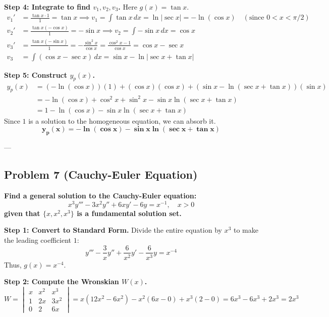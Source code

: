 \documentclass[12pt]{article}
\begin{document}
\textbf{Step 4: Integrate to find $v_1, v_2, v_3$.}
Here $g(x) = \tan x$.
\begin{align*}
v_1' &= \frac{\tan x \cdot 1}{1} = \tan x \implies v_1 = \int \tan x \, dx = \ln|\sec x| = -\ln(\cos x) \quad (\text{since } 0 < x < \pi/2) \\
v_2' &= \frac{\tan x (-\cos x)}{1} = -\sin x \implies v_2 = \int -\sin x \, dx = \cos x \\
v_3' &= \frac{\tan x (-\sin x)}{1} = -\frac{\sin^2 x}{\cos x} = \frac{\cos^2 x - 1}{\cos x} = \cos x - \sec x \\
v_3 &= \int (\cos x - \sec x) \, dx = \sin x - \ln|\sec x + \tan x|
\end{align*}

\textbf{Step 5: Construct $y_p(x)$.}
\begin{align*}
y_p(x) &= (-\ln(\cos x))(1) + (\cos x)(\cos x) + (\sin x - \ln(\sec x + \tan x))(\sin x) \\
&= -\ln(\cos x) + \cos^2 x + \sin^2 x - \sin x \ln(\sec x + \tan x) \\
&= 1 - \ln(\cos x) - \sin x \ln(\sec x + \tan x)
\end{align*}
Since $1$ is a solution to the homogeneous equation, we can absorb it.
\[ \mathbf{y_p(x) = -\ln(\cos x) - \sin x \ln(\sec x + \tan x)} \]

---

\subsection{Problem 7 (Cauchy-Euler Equation)}
\textbf{Find a general solution to the Cauchy-Euler equation:}
\[ x^3 y''' - 3x^2 y'' + 6x y' - 6y = x^{-1}, \quad x > 0 \]
\textbf{given that $\{x, x^2, x^3\}$ is a fundamental solution set.}

\textbf{Step 1: Convert to Standard Form.}
Divide the entire equation by $x^3$ to make the leading coefficient $1$:
\[ y''' - \frac{3}{x} y'' + \frac{6}{x^2} y' - \frac{6}{x^3} y = x^{-4} \]
Thus, $g(x) = x^{-4}$.

\textbf{Step 2: Compute the Wronskian $W(x)$.}
\[ W = \begin{vmatrix} x & x^2 & x^3 \\ 1 & 2x & 3x^2 \\ 0 & 2 & 6x \end{vmatrix} = x(12x^2 - 6x^2) - x^2(6x - 0) + x^3(2 - 0) = 6x^3 - 6x^3 + 2x^3 = 2x^3 \]
\end{document}
